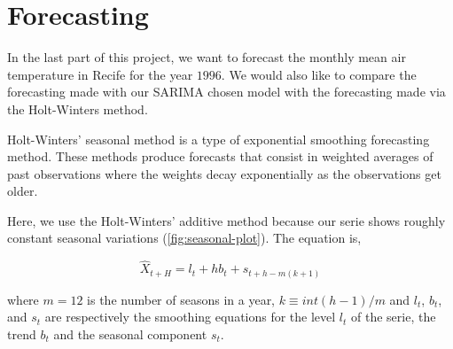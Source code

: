 \section{Forecasting}

In the last part of this project, we want to forecast the monthly mean air temperature in Recife for the year $1996$. We would also like to compare the forecasting made with our SARIMA chosen model with the forecasting made via the Holt-Winters method.

Holt-Winters' seasonal method is a type of exponential smoothing forecasting method. These methods produce forecasts that consist in weighted averages of past observations where the weights decay exponentially as the observations get older.

Here, we use the Holt-Winters' additive method because our serie shows roughly constant seasonal variations (\autoref{fig:seasonal-plot}). The equation is, 

\begin{equation}
	\hat{X}_{t + H} = l_t + h b_t + s_{t + h - m(k + 1)}
\end{equation}

where $m = 12$ is the number of seasons in a year, $k \equiv int(h - 1) / m$ and $l_t$, $b_t$, and $s_t$ are respectively the smoothing equations for the level $l_t$ of the serie, the trend $b_t$ and the seasonal component $s_t$.